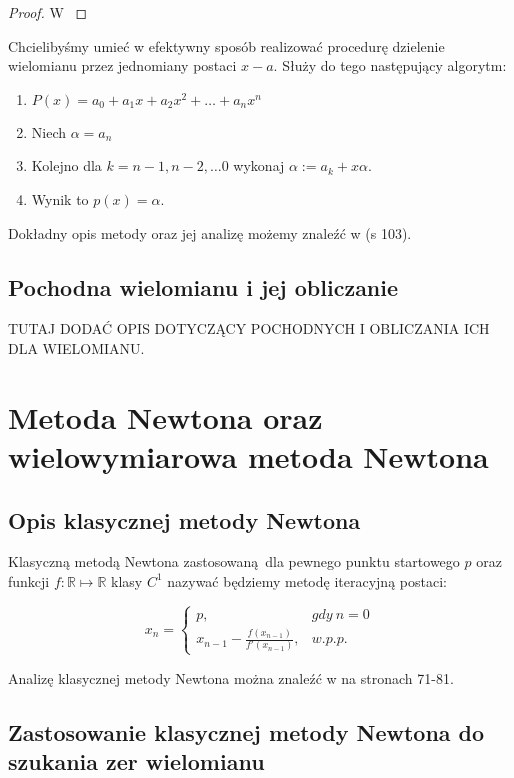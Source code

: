 \documentclass{article}
\begin{document}
\begin{proof}
W \cite{kostrikin}	
\end{proof}

Chcielibyśmy umieć w efektywny sposób realizować procedurę dzielenie wielomianu przez jednomiany postaci $x-a$. Służy do tego następujący algorytm:

\begin{enumerate}
\item $P(x) = a_0 + a_1 x + a_2 x^2 + \ldots + a_n x^n$
\item Niech $\alpha = a_n$
\item Kolejno dla $k = n-1, n-2, \ldots 0$ wykonaj $\alpha := a_k + x \alpha$.
\item Wynik to $p(x) = \alpha$.
\end{enumerate}

Dokładny opis metody oraz jej analizę możemy znaleźć w \cite{kincaid} (s 103).\\

\subsection{Pochodna wielomianu i jej obliczanie}

TUTAJ DODAĆ OPIS DOTYCZĄCY POCHODNYCH I OBLICZANIA ICH DLA WIELOMIANU.

\section{Metoda Newtona oraz wielowymiarowa metoda Newtona}

\subsection{Opis klasycznej metody Newtona}

Klasyczną metodą Newtona zastosowaną dla pewnego punktu startowego $p$ oraz funkcji $f : \mathbb{R} \mapsto \mathbb{R}$ klasy $C^{1}$ nazywać będziemy metodę iteracyjną postaci:

$$
x_n = \left\{\begin{matrix}
p, & gdy \ n = 0\\ 
x_{n-1} - \frac{f(x_{n-1})}{f'(x_{n-1})}, & w.p.p. 
\end{matrix}\right.
$$

Analizę klasycznej metody Newtona można znaleźć w \cite{kincaid} na stronach 71-81.

\subsection{Zastosowanie klasycznej metody Newtona do szukania zer wielomianu}
\end{document}

